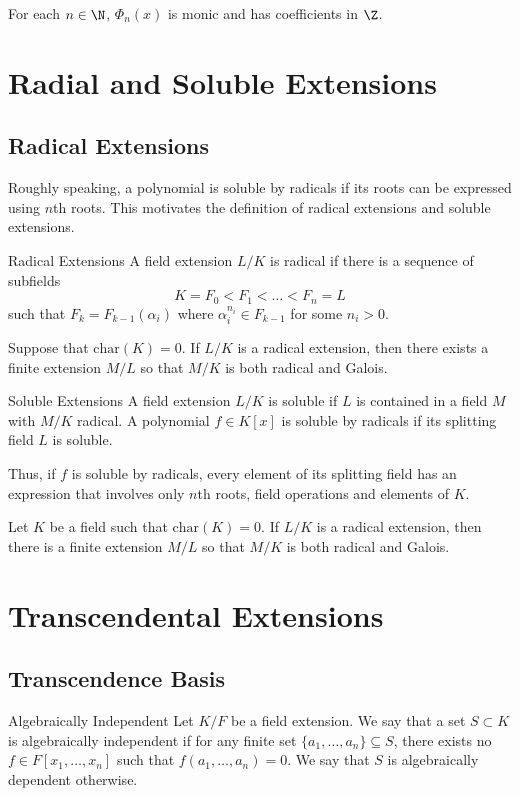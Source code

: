 \documentclass[a4paper]{article}
\begin{document}
\begin{prp}{}{} For each $n\in\N$, $\Phi_n(x)$ is monic and has coefficients in $\Z$. 
\end{prp}

\pagebreak
\section{Radial and Soluble Extensions}
\subsection{Radical Extensions}
Roughly speaking, a polynomial is soluble by radicals if its roots can be expressed using $n$th roots. This motivates the definition of radical extensions and soluble extensions. 

\begin{defn}{Radical Extensions}{} A field extension $L/K$ is radical if there is a sequence of subfields $$K=F_0<F_1<\dots<F_n=L$$ such that $F_k=F_{k-1}(\alpha_i)$ where $\alpha_i^{n_i}\in F_{k-1}$ for some $n_i>0$. 
\end{defn}

\begin{prp}{}{} Suppose that $\text{char}(K)=0$. If $L/K$ is a radical extension, then there exists a finite extension $M/L$ so that $M/K$ is both radical and Galois. 
\end{prp}

\begin{defn}{Soluble Extensions}{} A field extension $L/K$ is soluble if $L$ is contained in a field $M$ with $M/K$ radical. A polynomial $f\in K[x]$ is soluble by radicals if its splitting field $L$ is soluble. 
\end{defn}

Thus, if $f$ is soluble by radicals, every element of its splitting field has an expression that involves only $n$th roots, field operations and elements of $K$. 

\begin{prp}{}{} Let $K$ be a field such that $\text{char}(K)=0$. If $L/K$ is a radical extension, then there is a finite extension $M/L$ so that $M/K$ is both radical and Galois. 
\end{prp}

\pagebreak
\section{Transcendental Extensions}
\subsection{Transcendence Basis}
\begin{defn}{Algebraically Independent}{} Let $K/F$ be a field extension. We say that a set $S\subset K$ is algebraically independent if for any finite set $\{a_1,\dots,a_n\}\subseteq S$, there exists no $f\in F[x_1,\dots,x_n]$ such that $f(a_1,\dots,a_n)=0$. We say that $S$ is algebraically dependent otherwise. 
\end{defn}
\end{document}
